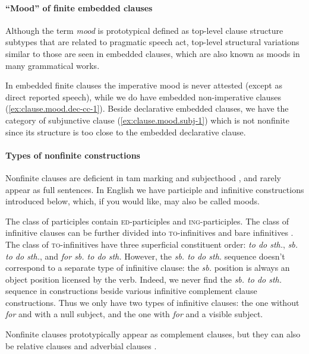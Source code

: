 \documentclass[UTF8, a4paper, oneside, scheme=plain, 12pt]{ctexbook}
\newcommand*{\citesec}[1]{\S~{#1}}
\newcommand*{\citechap}[1]{Ch.~{#1}}
\newcommand*{\citepage}[1]{p.~{#1}}
\newcommand*{\term}[1]{\emph{#1}}
\newcommand{\form}[1]{\emph{#1}}
\newcommand{\formcat}[1]{\textsc{#1}}
\begin{document}
\paragraph*{``Mood'' of finite embedded clauses} 
Although the term \term{mood} is prototypical defined as
top-level clause structure subtypes that are related to pragmatic speech act, 
top-level structural variations similar to those are seen in embedded clauses,
which are also known as moods in many grammatical works.

In embedded finite clauses
the imperative mood is never attested (except as direct reported speech),
while we do have embedded non-imperative clauses (\ref{ex:clause.mood.dec-cc-1}).
Beside declarative embedded clauses,
we have the category of subjunctive clause (\ref{ex:clause.mood.subj-1})
which is not nonfinite since its structure is too close to 
the embedded declarative clause. 

\paragraph*{Types of nonfinite constructions} 
Nonfinite clauses are deficient in \acs{tam} marking and subjecthood
\citep[\citepage{1174}, {[5-7]}]{cgel},
and rarely appear as full sentences.
In English we have participle and infinitive constructions introduced below, 
which, if you would like, may also be called moods.

The class of participles contain \formcat{ed}-participles and \formcat{ing}-participles.
The class of infinitive clauses can be further divided into 
\formcat{to}-infinitives and bare infinitives \citet[\citechap{14}, \citesec{1.4.3}]{cgel}.
The class of \formcat{to}-infinitives have three superficial constituent order:
\form{to do sth.}, \form{sb. to do sth.}, and \form{for sb. to do sth.}
However, the \form{sb. to do sth.} sequence doesn't correspond to a separate type of infinitive clause:
the \form{sb.} position is always an object position licensed by the verb.
Indeed, we never find the \form{sb. to do sth.} sequence
in constructions beside various infinitive complement clause constructions.
Thus we only have two types of infinitive clauses:
the one without \form{for} and with a null subject,
and the one with \form{for} and a visible subject.

Nonfinite clauses prototypically appear as complement clauses, 
but they can also be relative clauses and adverbial clauses \citep[\citepage{1264}]{cgel}.
\end{document}
